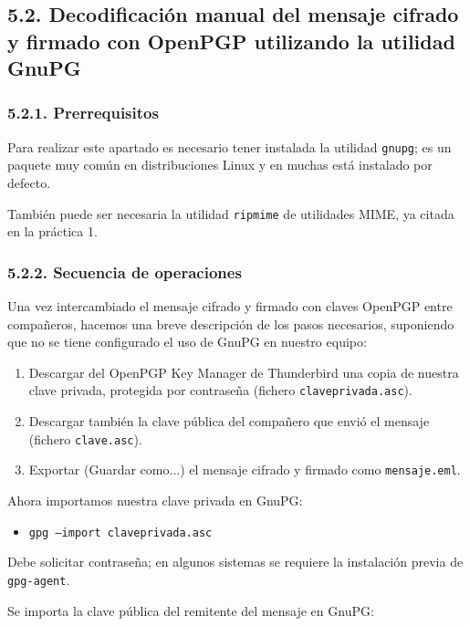 \subsection*{5.2. Decodificación manual del mensaje cifrado y firmado con OpenPGP utilizando la utilidad GnuPG}

\subsubsection*{5.2.1. Prerrequisitos}

Para realizar este apartado es necesario tener instalada la utilidad \texttt{gnupg}; es un paquete muy común
en distribuciones Linux y en muchas está instalado por defecto.

También puede ser necesaria la utilidad \texttt{ripmime} de utilidades MIME, ya citada en la práctica 1.

\subsubsection*{5.2.2. Secuencia de operaciones}

Una vez intercambiado el mensaje cifrado y firmado con claves OpenPGP entre compañeros, hacemos una
breve descripción de los pasos necesarios, suponiendo que no se tiene configurado el uso de GnuPG en
nuestro equipo:

\begin{enumerate}
    \item Descargar del OpenPGP Key Manager de Thunderbird una copia de nuestra clave privada,
    protegida por contraseña (fichero \texttt{claveprivada.asc}).
    \item Descargar también la clave pública del compañero que envió el mensaje (fichero \texttt{clave.asc}).
    \item Exportar (Guardar como...) el mensaje cifrado y firmado como \texttt{mensaje.eml}.
\end{enumerate}

Ahora importamos nuestra clave privada en GnuPG:

\begin{itemize}[label=\textbullet]
    \item \texttt{gpg --import claveprivada.asc}
\end{itemize}

Debe solicitar contraseña; en algunos sistemas se requiere la instalación previa de \texttt{gpg-agent}.

Se importa la clave pública del remitente del mensaje en GnuPG:

